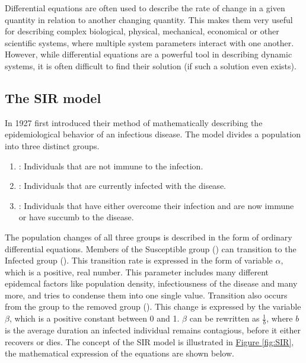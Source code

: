 Differential equations are often used to describe the rate of change in a given quantity in relation to another
changing quantity. This makes them very useful for describing complex biological, physical, mechanical, economical
or other scientific systems, where multiple system parameters interact with one another. However, while differential
equations are a powerful tool in describing dynamic systems, it is often difficult to find their solution (if such
a solution even exists).


\subsection{The SIR model}
\label{sec:SIR}
In 1927 \cite{kermack1991contributions} first introduced their method of mathematically describing  
the epidemiological behavior of an infectious disease. The model divides a population into three distinct groups.

\begin{enumerate}[label=$\bullet$]
	\item {}: Individuals that are not immune to the infection.
	\item {}: Individuals that are currently infected with the disease.
	\item {}: Individuals that  have either overcome their infection and are now immune or have succumb to the disease.
\end{enumerate}


The population changes of all three groups is described in the form of ordinary differential equations\cite{mathSIR}.
Members of the Susceptible group () can transition to the Infected group (). This transition rate is expressed in the
form of variable $\alpha$, which is a positive, real number. This parameter includes many different epidemcal factors like
population density, infectiousness of the disease and many more, and tries to condense them into one single value.
Transition also occurs from the  group to the removed group (). This change is expressed by the variable 
$\beta$, which is a positive constant between 0 and 1. $\beta$ can be rewritten as $\frac{1}{b}$, where $b$ is the average
duration an infected individual remains contagious, before it either recovers or dies. The concept of the SIR model is
illustrated in \hyperref[fig:SIR]{Figure \ref*{fig:SIR}}, the mathematical expression of the equations are shown below. 

